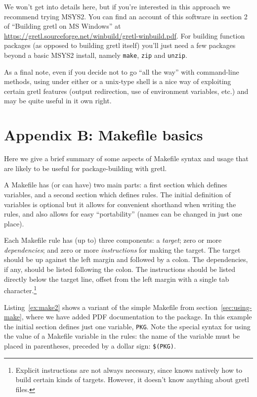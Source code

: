 \documentclass[oneside]{book}
\begin{document}
We won't get into details here, but if you're interested in this
approach we recommend trying \textsf{MSYS2}. You can find an account
of this software in section 2 of ``Building gretl on MS Windows'' at
\url{https://gretl.sourceforge.net/winbuild/gretl-winbuild.pdf}.  For
building function packages (as opposed to building gretl itself)
you'll just need a few packages beyond a basic \textsf{MSYS2} install,
namely \texttt{make}, \texttt{zip} and \texttt{unzip}.

As a final note, even if you decide not to go ``all the way'' with
command-line methods, using  under either 
or a unix-type shell is a nice way of exploiting certain gretl
features (output redirection, use of environment variables, etc.) and
may be quite useful in it own right.


\section*{Appendix B: Makefile basics}

Here we give a brief summary of some aspects of Makefile syntax and
usage that are likely to be useful for package-building with gretl.

A Makefile has (or can have) two main parts: a first section which
defines variables, and a second section which defines rules. The
initial definition of variables is optional but it allows for
convenient shorthand when writing the rules, and also allows for easy
``portability'' (names can be changed in just one place).

Each Makefile rule has (up to) three components: a \textit{target};
zero or more \textit{dependencies}; and zero or more
\textit{instructions} for making the target. The target should be up
against the left margin and followed by a colon. The dependencies, if
any, should be listed following the colon. The instructions should be
listed directly below the target line, offset from the left margin
with a single tab character.\footnote{Explicit instructions are not
  always necessary, since  knows natively how to build
  certain kinds of targets. However, it doesn't know anything about
  gretl files.}

Listing~\ref{ex:make2} shows a variant of the simple Makefile from
section~\ref{sec:using-make}, where we have added PDF documentation to
the package. In this example the initial section defines just one
variable, \texttt{PKG}. Note the special syntax for using the value of
a Makefile variable in the rules: the name of the variable must be
placed in parentheses, preceded by a dollar sign: \texttt{\$(PKG)}.
\end{document}
